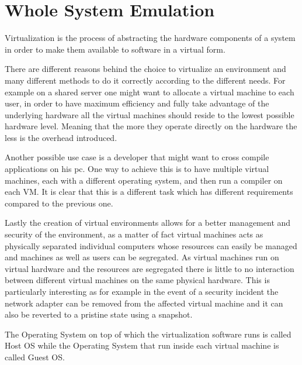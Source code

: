 \chapter{Whole System Emulation}

Virtualization is the process of abstracting the hardware components of a system in order to make them available to software in a virtual form.

There are different reasons behind the choice to virtualize an environment and many different methods to do it correctly according to the different needs. For example on a shared server one might want to allocate a virtual machine to each user, in order to have maximum efficiency and fully take advantage of the underlying hardware all the virtual machines should reside to the lowest possible hardware level. Meaning that the more they operate directly on the hardware the less is the overhead introduced.

Another possible use case is a developer that might want to cross compile applications on his pc. One way to achieve this is to have multiple virtual machines, each with a different operating system, and then run a compiler on each VM. It is clear that this is a different task which has different requirements compared to the previous one.

Lastly the creation of virtual environments allows for a better management and security of the environment, as a matter of fact virtual machines acts as physically separated individual computers whose resources can easily be managed and machines as well as users can be segregated. As virtual machines run on virtual hardware and the resources are segregated there is little to no interaction between different virtual machines on the same physical hardware. This is particularly interesting as for example in the event of a security incident the network adapter can be removed from the affected virtual machine and it can also be reverted to a pristine state using a snapshot. 

The Operating System on top of which the virtualization software runs is called Host OS while the Operating System that run inside each virtual machine is called Guest OS. 


